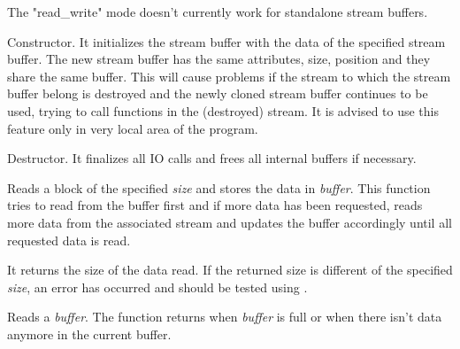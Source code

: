 
The "read\_write" mode doesn't currently work for standalone stream buffers.


Constructor. It initializes the stream buffer with the data of the specified
stream buffer. The new stream buffer has the same attributes, size, position
and they share the same buffer. This will cause problems if the stream to
which the stream buffer belong is destroyed and the newly cloned stream
buffer continues to be used, trying to call functions in the (destroyed)
stream. It is advised to use this feature only in very local area of the
program.



\label{wxstreambufferdtor}


Destructor. It finalizes all IO calls and frees all internal buffers if
necessary.

\label{wxstreambufferread}


Reads a block of the specified {\it size} and stores the data in {\it buffer}.
This function tries to read from the buffer first and if more data has been
requested, reads more data from the associated stream and updates the buffer
accordingly until all requested data is read.


It returns the size of the data read. If the returned size is different of the specified 
{\it size}, an error has occurred and should be tested using 
.


Reads a {\it buffer}. The function returns when {\it buffer} is full or when there isn't
data anymore in the current buffer.



\label{wxstreambufferwrite}

